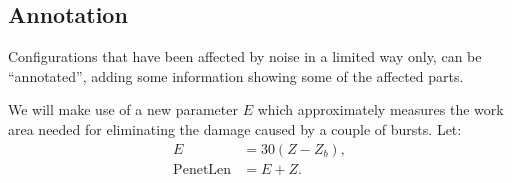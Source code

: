 \documentclass[12pt]{memoir}
\def\B{B}
\newcommand{\E}{E}
\newcommand{\Noise}{\mathit{Noise}}
\newcommand{\PenetrationLen}{\mathrm{PenetLen}}
\newcommand{\Z}{Z}
\begin{document}


\subsection{Annotation}

Configurations that have been affected by noise in a limited way only, can be ``annotated'',
adding some information showing some of the affected parts. 

We will make use of a new parameter \( \E \) which approximately measures the work 
area needed for eliminating the damage caused by a couple of bursts.
Let:
\begin{align}\label{eq:Expansion}
   \E  &= 30(\Z-\Z_{b}), %
\\   \PenetrationLen &= \E+\Z.
 \end{align}
\end{document}
